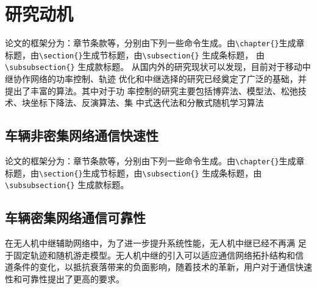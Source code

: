 \section{研究动机}\label{section1-3}
论文的框架分为：章节条款等，分别由下列一些命令生成。由\verb|\chapter{}|生成章标题，由\verb|\section{}|生成节标题，由\verb|\subsection{}| 生成条标题，   由 \verb|\subsubsection{}| 生成款标题。
从国内外的研究现状可以发现，目前对于移动中继协作网络的功率控制、轨迹
优化和中继选择的研究已经奠定了广泛的基础，并提出了丰富的算法。其中对于功
率控制的研究主要包括博弈法、模型法、松弛技术、块坐标下降法、反演算法、集
中式迭代法和分散式随机学习算法
\subsection{车辆非密集网络通信快速性}\label{section1-3-1}
论文的框架分为：章节条款等，分别由下列一些命令生成。由\verb|\chapter{}|生成章标题，由\verb|\section{}|生成节标题，由\verb|\subsection{}| 生成条标题，由 \verb|\subsubsection{}| 生成款标题。
\subsection{车辆密集网络通信可靠性}\label{section1-3-2}
\textcolor[RGB]{202,12,22}{在无人机中继辅助网络中，为了进一步提升系统性能，无人机中继已经不再满
足于固定轨迹和随机游走模型。无人机中继的引入可以适应通信网络拓扑结构和信
道条件的变化，以抵抗衰落带来的负面影响，随着技术的革新，用户对于通信快速
性和可靠性提出了更高的要求。}
